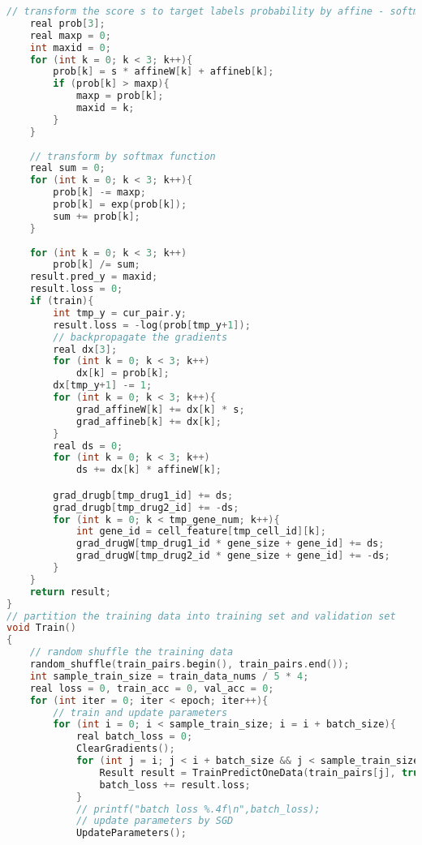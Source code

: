 \documentclass{article}
\begin{document}
\begin{lstlisting}[language=c++]
    // transform the score s to target labels probability by affine - softmax layers
    real prob[3];
    real maxp = 0;
    int maxid = 0;
    for (int k = 0; k < 3; k++){
        prob[k] = s * affineW[k] + affineb[k];
        if (prob[k] > maxp){
            maxp = prob[k];
            maxid = k;
        }
    }
    
    // transform by softmax function
    real sum = 0;
    for (int k = 0; k < 3; k++){
        prob[k] -= maxp;
        prob[k] = exp(prob[k]);
        sum += prob[k];
    }
    
    for (int k = 0; k < 3; k++)
        prob[k] /= sum;
    result.pred_y = maxid;
    result.loss = 0;
    if (train){
        int tmp_y = cur_pair.y;
        result.loss = -log(prob[tmp_y+1]);
        // backpropagate the gradients
        real dx[3];
        for (int k = 0; k < 3; k++)
            dx[k] = prob[k];
        dx[tmp_y+1] -= 1;
        for (int k = 0; k < 3; k++){
            grad_affineW[k] += dx[k] * s;
            grad_affineb[k] += dx[k];
        }
        real ds = 0;
        for (int k = 0; k < 3; k++)
            ds += dx[k] * affineW[k];

        grad_drugb[tmp_drug1_id] += ds;
        grad_drugb[tmp_drug2_id] += -ds;
        for (int k = 0; k < tmp_gene_num; k++){
            int gene_id = cell_feature[tmp_cell_id][k];
            grad_drugW[tmp_drug1_id * gene_size + gene_id] += ds;
            grad_drugW[tmp_drug2_id * gene_size + gene_id] += -ds;
        }
    }
    return result;
}
// partition the training data into training set and validation set
void Train()
{
    // random shuffle the training data
    random_shuffle(train_pairs.begin(), train_pairs.end());
    int sample_train_size = train_data_nums / 5 * 4;
    real loss = 0, train_acc = 0, val_acc = 0;
    for (int iter = 0; iter < epoch; iter++){
        // train and update parameters
        for (int i = 0; i < sample_train_size; i = i + batch_size){
            real batch_loss = 0;
            ClearGradients();
            for (int j = i; j < i + batch_size && j < sample_train_size; j++){
                Result result = TrainPredictOneData(train_pairs[j], true);
                batch_loss += result.loss;
            }
            // printf("batch loss %.4f\n",batch_loss);
            // update parameters by SGD
            UpdateParameters();
            

\end{lstlisting}
\end{document}
